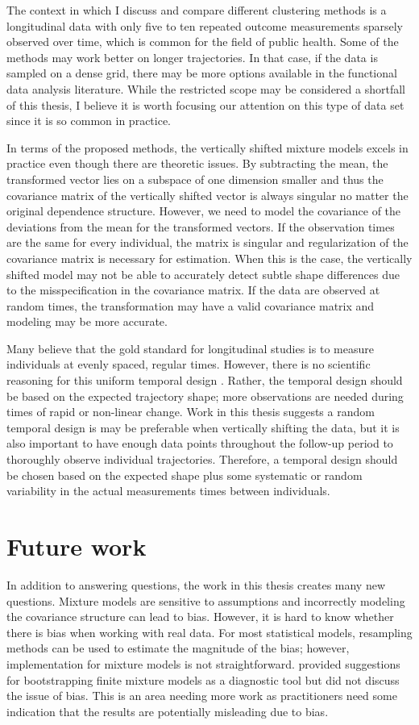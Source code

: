 The context in which I discuss and compare different clustering methods is a longitudinal data with only five to ten repeated outcome measurements sparsely observed over time, which is common for the field of public health. Some of the methods may work better on longer trajectories. In that case, if the data is sampled on a dense grid, there may be more options available in the functional data analysis literature. While the restricted scope may be considered a shortfall of this thesis, I believe it is worth focusing our attention on this type of data set since it is so common in practice.

In terms of the proposed methods, the vertically shifted mixture models excels in practice even though there are theoretic issues. By subtracting the mean, the transformed vector lies on a subspace of one dimension smaller and thus the covariance matrix of the vertically shifted vector is always singular no matter the original dependence structure. However, we need to model the covariance of the deviations from the mean for the transformed vectors. If the observation times are the same for every individual, the matrix is singular and regularization of the covariance matrix is necessary for estimation. When this is the case, the vertically shifted model may not be able to accurately detect subtle shape differences due to the misspecification in the covariance matrix. If the data are observed at random times, the transformation may have a valid covariance matrix and modeling may be more accurate. 

Many believe that the gold standard for longitudinal studies is to measure individuals at evenly spaced, regular times. However, there is no scientific reasoning for this uniform temporal design \cite{collins2006}. Rather, the temporal design should be based on the expected trajectory shape; more observations are needed during times of rapid or non-linear change. Work in this thesis suggests a random temporal design is may be preferable when vertically shifting the data, but it is also important to have enough data points throughout the follow-up period to thoroughly observe individual trajectories. Therefore, a temporal design should be chosen based on the expected shape plus some systematic or random variability in the actual measurements times between individuals. 

\section{Future work}
In addition to answering questions, the work in this thesis creates many new questions. Mixture models are sensitive to assumptions and incorrectly modeling the covariance structure can lead to bias. However, it is hard to know whether there is bias when working with real data. For most statistical models, resampling methods can be used to estimate the magnitude of the bias; however, implementation for mixture models is not straightforward. \Textcite{grun2004} provided suggestions for bootstrapping finite mixture models as a diagnostic tool but did not discuss the issue of bias. This is an area needing more work as practitioners need some indication that the results are potentially misleading due to bias. 

